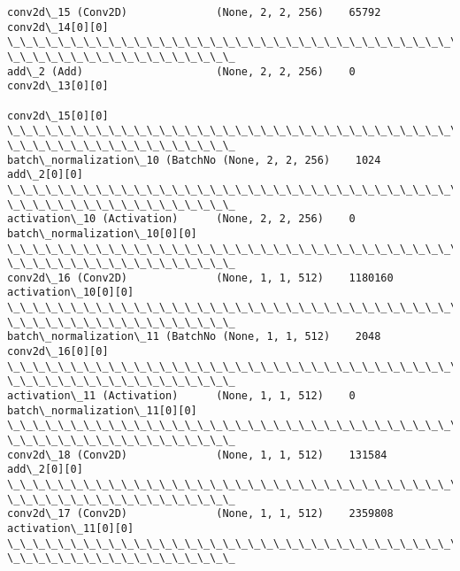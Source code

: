 \documentclass[11pt]{article}
\begin{document}
\begin{Verbatim}[commandchars=\\\{\}]
conv2d\_15 (Conv2D)              (None, 2, 2, 256)    65792       conv2d\_14[0][0]
\_\_\_\_\_\_\_\_\_\_\_\_\_\_\_\_\_\_\_\_\_\_\_\_\_\_\_\_\_\_\_\_\_\_\_\_\_\_\_\_\_\_\_\_\_\_\_\_\_\_\_\_\_\_\_\_\_\_\_\_\_\_\_\_\_\_\_\_\_\_\_\_\_\_\_\_\_\_\_\_
\_\_\_\_\_\_\_\_\_\_\_\_\_\_\_\_\_\_
add\_2 (Add)                     (None, 2, 2, 256)    0           conv2d\_13[0][0]
                                                                 conv2d\_15[0][0]
\_\_\_\_\_\_\_\_\_\_\_\_\_\_\_\_\_\_\_\_\_\_\_\_\_\_\_\_\_\_\_\_\_\_\_\_\_\_\_\_\_\_\_\_\_\_\_\_\_\_\_\_\_\_\_\_\_\_\_\_\_\_\_\_\_\_\_\_\_\_\_\_\_\_\_\_\_\_\_\_
\_\_\_\_\_\_\_\_\_\_\_\_\_\_\_\_\_\_
batch\_normalization\_10 (BatchNo (None, 2, 2, 256)    1024        add\_2[0][0]
\_\_\_\_\_\_\_\_\_\_\_\_\_\_\_\_\_\_\_\_\_\_\_\_\_\_\_\_\_\_\_\_\_\_\_\_\_\_\_\_\_\_\_\_\_\_\_\_\_\_\_\_\_\_\_\_\_\_\_\_\_\_\_\_\_\_\_\_\_\_\_\_\_\_\_\_\_\_\_\_
\_\_\_\_\_\_\_\_\_\_\_\_\_\_\_\_\_\_
activation\_10 (Activation)      (None, 2, 2, 256)    0
batch\_normalization\_10[0][0]
\_\_\_\_\_\_\_\_\_\_\_\_\_\_\_\_\_\_\_\_\_\_\_\_\_\_\_\_\_\_\_\_\_\_\_\_\_\_\_\_\_\_\_\_\_\_\_\_\_\_\_\_\_\_\_\_\_\_\_\_\_\_\_\_\_\_\_\_\_\_\_\_\_\_\_\_\_\_\_\_
\_\_\_\_\_\_\_\_\_\_\_\_\_\_\_\_\_\_
conv2d\_16 (Conv2D)              (None, 1, 1, 512)    1180160
activation\_10[0][0]
\_\_\_\_\_\_\_\_\_\_\_\_\_\_\_\_\_\_\_\_\_\_\_\_\_\_\_\_\_\_\_\_\_\_\_\_\_\_\_\_\_\_\_\_\_\_\_\_\_\_\_\_\_\_\_\_\_\_\_\_\_\_\_\_\_\_\_\_\_\_\_\_\_\_\_\_\_\_\_\_
\_\_\_\_\_\_\_\_\_\_\_\_\_\_\_\_\_\_
batch\_normalization\_11 (BatchNo (None, 1, 1, 512)    2048        conv2d\_16[0][0]
\_\_\_\_\_\_\_\_\_\_\_\_\_\_\_\_\_\_\_\_\_\_\_\_\_\_\_\_\_\_\_\_\_\_\_\_\_\_\_\_\_\_\_\_\_\_\_\_\_\_\_\_\_\_\_\_\_\_\_\_\_\_\_\_\_\_\_\_\_\_\_\_\_\_\_\_\_\_\_\_
\_\_\_\_\_\_\_\_\_\_\_\_\_\_\_\_\_\_
activation\_11 (Activation)      (None, 1, 1, 512)    0
batch\_normalization\_11[0][0]
\_\_\_\_\_\_\_\_\_\_\_\_\_\_\_\_\_\_\_\_\_\_\_\_\_\_\_\_\_\_\_\_\_\_\_\_\_\_\_\_\_\_\_\_\_\_\_\_\_\_\_\_\_\_\_\_\_\_\_\_\_\_\_\_\_\_\_\_\_\_\_\_\_\_\_\_\_\_\_\_
\_\_\_\_\_\_\_\_\_\_\_\_\_\_\_\_\_\_
conv2d\_18 (Conv2D)              (None, 1, 1, 512)    131584      add\_2[0][0]
\_\_\_\_\_\_\_\_\_\_\_\_\_\_\_\_\_\_\_\_\_\_\_\_\_\_\_\_\_\_\_\_\_\_\_\_\_\_\_\_\_\_\_\_\_\_\_\_\_\_\_\_\_\_\_\_\_\_\_\_\_\_\_\_\_\_\_\_\_\_\_\_\_\_\_\_\_\_\_\_
\_\_\_\_\_\_\_\_\_\_\_\_\_\_\_\_\_\_
conv2d\_17 (Conv2D)              (None, 1, 1, 512)    2359808
activation\_11[0][0]
\_\_\_\_\_\_\_\_\_\_\_\_\_\_\_\_\_\_\_\_\_\_\_\_\_\_\_\_\_\_\_\_\_\_\_\_\_\_\_\_\_\_\_\_\_\_\_\_\_\_\_\_\_\_\_\_\_\_\_\_\_\_\_\_\_\_\_\_\_\_\_\_\_\_\_\_\_\_\_\_
\_\_\_\_\_\_\_\_\_\_\_\_\_\_\_\_\_\_

\end{Verbatim}
\end{document}
